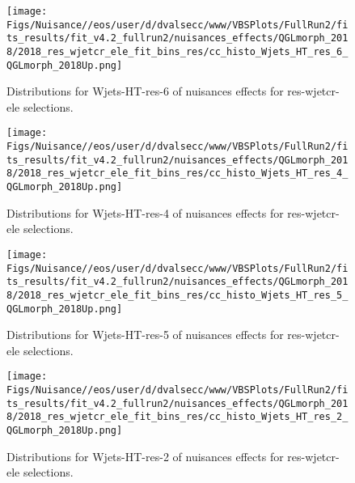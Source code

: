 


\begin{figure*}[htbp]  
\centering 
\texttt{[image: Figs/Nuisance//eos/user/d/dvalsecc/www/VBSPlots/FullRun2/fits\_results/fit\_v4.2\_fullrun2/nuisances\_effects/QGLmorph\_2018/2018\_res\_wjetcr\_ele\_fit\_bins\_res/cc\_histo\_Wjets\_HT\_res\_6\_QGLmorph\_2018Up.png]}
\\ 
\caption{ 
   Distributions for Wjets-HT-res-6 of nuisances effects for res-wjetcr-ele selections.
} 
\label{fig:Wjets_HT_res_6_res_wjetcr_ele} 
\end{figure*} 




\begin{figure*}[htbp]  
\centering 
\texttt{[image: Figs/Nuisance//eos/user/d/dvalsecc/www/VBSPlots/FullRun2/fits\_results/fit\_v4.2\_fullrun2/nuisances\_effects/QGLmorph\_2018/2018\_res\_wjetcr\_ele\_fit\_bins\_res/cc\_histo\_Wjets\_HT\_res\_4\_QGLmorph\_2018Up.png]}
\\ 
\caption{ 
   Distributions for Wjets-HT-res-4 of nuisances effects for res-wjetcr-ele selections.
} 
\label{fig:Wjets_HT_res_4_res_wjetcr_ele} 
\end{figure*} 




\begin{figure*}[htbp]  
\centering 
\texttt{[image: Figs/Nuisance//eos/user/d/dvalsecc/www/VBSPlots/FullRun2/fits\_results/fit\_v4.2\_fullrun2/nuisances\_effects/QGLmorph\_2018/2018\_res\_wjetcr\_ele\_fit\_bins\_res/cc\_histo\_Wjets\_HT\_res\_5\_QGLmorph\_2018Up.png]}
\\ 
\caption{ 
   Distributions for Wjets-HT-res-5 of nuisances effects for res-wjetcr-ele selections.
} 
\label{fig:Wjets_HT_res_5_res_wjetcr_ele} 
\end{figure*} 




\begin{figure*}[htbp]  
\centering 
\texttt{[image: Figs/Nuisance//eos/user/d/dvalsecc/www/VBSPlots/FullRun2/fits\_results/fit\_v4.2\_fullrun2/nuisances\_effects/QGLmorph\_2018/2018\_res\_wjetcr\_ele\_fit\_bins\_res/cc\_histo\_Wjets\_HT\_res\_2\_QGLmorph\_2018Up.png]}
\\ 
\caption{ 
   Distributions for Wjets-HT-res-2 of nuisances effects for res-wjetcr-ele selections.
} 
\label{fig:Wjets_HT_res_2_res_wjetcr_ele} 
\end{figure*} 




